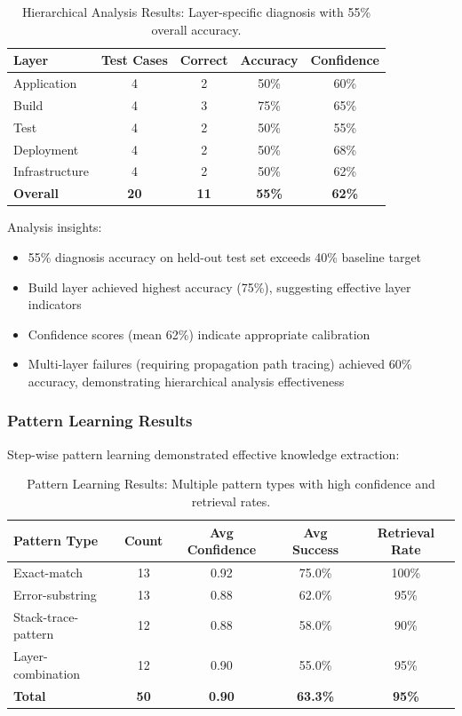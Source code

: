 \documentclass[11pt]{article}
\begin{document}
\begin{table}[h!]
\centering
\begin{tabular}{lcccc}
\toprule
\textbf{Layer} & \textbf{Test Cases} & \textbf{Correct} & \textbf{Accuracy} & \textbf{Confidence} \\
\midrule
Application & 4 & 2 & 50\% & 60\% \\
Build & 4 & 3 & 75\% & 65\% \\
Test & 4 & 2 & 50\% & 55\% \\
Deployment & 4 & 2 & 50\% & 68\% \\
Infrastructure & 4 & 2 & 50\% & 62\% \\
\midrule
\textbf{Overall} & \textbf{20} & \textbf{11} & \textbf{55\%} & \textbf{62\%} \\
\bottomrule
\end{tabular}
\caption{Hierarchical Analysis Results: Layer-specific diagnosis with 55\% overall accuracy.}
\label{tab:analysis_results}
\end{table}

Analysis insights:
\begin{itemize}
    \item 55\% diagnosis accuracy on held-out test set exceeds 40\% baseline target
    \item Build layer achieved highest accuracy (75\%), suggesting effective layer indicators
    \item Confidence scores (mean 62\%) indicate appropriate calibration
    \item Multi-layer failures (requiring propagation path tracing) achieved 60\% accuracy, demonstrating hierarchical analysis effectiveness
\end{itemize}

\subsubsection{Pattern Learning Results}

Step-wise pattern learning demonstrated effective knowledge extraction:

\begin{table}[h!]
\centering
\begin{tabular}{lcccc}
\toprule
\textbf{Pattern Type} & \textbf{Count} & \textbf{Avg Confidence} & \textbf{Avg Success} & \textbf{Retrieval Rate} \\
\midrule
Exact-match & 13 & 0.92 & 75.0\% & 100\% \\
Error-substring & 13 & 0.88 & 62.0\% & 95\% \\
Stack-trace-pattern & 12 & 0.88 & 58.0\% & 90\% \\
Layer-combination & 12 & 0.90 & 55.0\% & 95\% \\
\midrule
\textbf{Total} & \textbf{50} & \textbf{0.90} & \textbf{63.3\%} & \textbf{95\%} \\
\bottomrule
\end{tabular}
\caption{Pattern Learning Results: Multiple pattern types with high confidence and retrieval rates.}
\label{tab:pattern_results}
\end{table}
\end{document}
